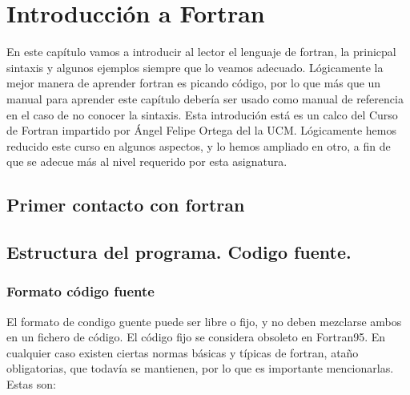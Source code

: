 \chapter{Introducción a Fortran}

En este capítulo vamos a introducir al lector el lenguaje de fortran, la prinicpal sintaxis y algunos ejemplos siempre que lo veamos adecuado. Lógicamente la mejor manera de aprender fortran es picando código, por lo que más que un manual para aprender este capítulo debería ser usado como manual de referencia en el caso de no conocer la sintaxis. Esta introdución está es un calco del Curso de Fortran impartido por Ángel Felipe Ortega del la UCM. Lógicamente hemos reducido este curso en algunos aspectos, y lo hemos ampliado en otro, a fin de que se adecue más al nivel requerido por esta asignatura.

\section{Primer contacto con fortran}


\section{Estructura del programa. Codigo fuente.}

\subsection{Formato código fuente}

El formato de condigo guente puede ser libre o fijo, y no deben mezclarse ambos en un fichero de código. El código fijo se considera obsoleto en Fortran95. En cualquier caso existen ciertas normas básicas y típicas de fortran, ataño obligatorias, que todavía se mantienen, por lo que es importante mencionarlas. Estas son:


